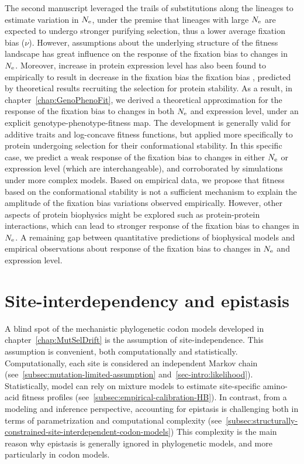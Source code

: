 The second manuscript leveraged the trails of substitutions along the lineages to estimate variation in $N_{\textrm{e}}$, under the premise that lineages with large $N_{\textrm{e}}$ are expected to undergo stronger purifying selection, thus a lower average fixation bias ($\nu$).
However, assumptions about the underlying structure of the fitness landscape has great influence on the response of the fixation bias to changes in $N_{\textrm{e}}$.
Moreover, increase in protein expression level has also been found to empirically to result in decrease in the fixation bias the fixation bias , predicted by theoretical results recruiting the selection for protein stability.
As a result, in chapter~\ref{chap:GenoPhenoFit}, we derived a theoretical approximation for the response of the fixation bias to changes in both $N_{\textrm{e}}$ and expression level, under an explicit genotype-phenotype-fitness map.
The development is generally valid for additive traits and log-concave fitness functions, but applied more specifically to protein undergoing selection for their conformational stability.
In this specific case, we predict a weak response of the fixation bias to changes in either $N_{\textrm{e}}$ or expression level (which are interchangeable), and corroborated by simulations under more complex models.
Based on empirical data, we propose that fitness based on the conformational stability is not a sufficient mechanism to explain the amplitude of the fixation bias variations observed empirically.
However, other aspects of protein biophysics might be explored such as protein-protein interactions, which can lead to stronger response of the fixation bias to changes in $N_{\textrm{e}}$.
A remaining gap between quantitative predictions of biophysical models and empirical observations about response of the fixation bias to changes in $N_{\textrm{e}}$ and expression level.


\section{Site-interdependency and epistasis}
\label{sec:epistasis-and-entrenchment}

A blind spot of the mechanistic phylogenetic codon models developed in chapter~\ref{chap:MutSelDrift} is the assumption of site-independence.
This assumption is convenient, both computationally and statistically.
Computationally, each site is considered an independent Markov chain (see~\ref{subsec:mutation-limited-assumption} and~\ref{sec-intro:likelihood}).
Statistically, model can rely on mixture models to estimate site-specific amino-acid fitness profiles (see~\ref{subsec:empirical-calibration-HB}).
In contrast, from a modeling and inference perspective, accounting for epistasis is challenging both in terms of parametrization and computational complexity (see~\ref{subsec:structurally-constrained-site-interdependent-codon-models})
This complexity is the main reason why epistasis is generally ignored in phylogenetic models, and more particularly in codon models.

